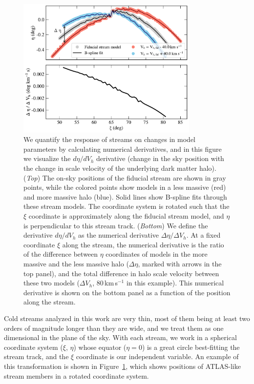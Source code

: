 \documentclass[modern]{aastex61}
\begin{document}
\begin{figure}
\begin{center}
\includegraphics[width=0.8\textwidth]{derivative_vis.pdf}
\caption{We quantify the response of streams on changes in model parameters by calculating numerical derivatives, and in this figure we visualize the $d\eta / d V_h$ derivative (change in the sky position with the change in scale velocity of the underlying dark matter halo).
(\emph{Top}) The on-sky positions of the fiducial stream are shown in gray points, while the colored points show models in a less massive (red) and more massive halo (blue).
Solid lines show B-spline fits through these stream models.
The coordinate system is rotated such that the $\xi$ coordinate is approximately along the fiducial stream model, and $\eta$ is perpendicular to this stream track. 
(\emph{Bottom}) We define the derivative $d\eta / d V_h$ as the numerical derivative $\Delta\eta / \Delta V_h$.
At a fixed coordinate $\xi$ along the stream, the numerical derivative is the ratio of the difference between $\eta$ coordinates of models in the more massive and the less massive halo ($\Delta\eta$, marked with arrows in the top panel), and the total difference in halo scale velocity between these two models ($\Delta V_h$, 80\,km\,s$^{-1}$ in this example).
This numerical derivative is shown on the bottom panel as a function of the position along the stream.
}
\label{fig:derivative_steps}
\end{center}
\end{figure}

Cold streams analyzed in this work are very thin, most of them being at least two orders of magnitude longer than they are wide, and we treat them as one dimensional in the plane of the sky.
With each stream, we work in a spherical coordinate system ($\xi$, $\eta$) whose equator ($\eta=0$) is a great circle best-fitting the stream track, and the $\xi$ coordinate is our independent variable.
An example of this transformation is shown in Figure~\ref{fig:derivative_steps}, which shows positions of ATLAS-like stream members in a rotated coordinate system.
\end{document}
